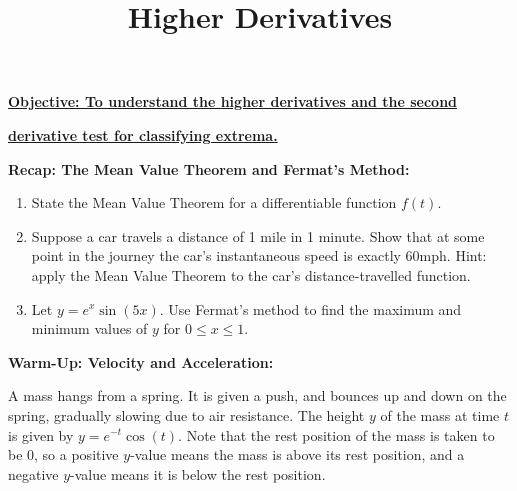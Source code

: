 \documentclass{article}
\begin{document}
\title{Higher Derivatives}
\date{}

\maketitle
\thispagestyle{empty}

\Large

\textbf{\underline{Objective: To understand the higher derivatives and the second}}

\textbf{\underline{derivative test for classifying extrema.}}




\vspace{5mm}


\textbf{Recap: The Mean Value Theorem and Fermat's Method:}

\vspace{5mm}


\begin{enumerate}
	\item State the Mean Value Theorem for a differentiable function $f(t)$.
	\item Suppose a car travels a distance of 1 mile in 1 minute. Show that at some point in the journey the car's instantaneous speed is exactly 60mph. Hint: apply the Mean Value Theorem to the car's distance-travelled function.
	\item Let $y=e^x\sin(5x)$. Use Fermat's method to find the maximum and minimum values of $y$ for $0\leq x\leq 1$.
\end{enumerate}

\bigskip




\clearpage


{\bf Warm-Up: Velocity and Acceleration:}

\vspace{5mm}


A mass hangs from a spring. It is given a push, and bounces up and down on the spring, gradually slowing due to air resistance. The height $y$ of the mass at time $t$ is given by $y=e^{- t}\cos(t)$. Note that the rest position of the mass is taken to be 0, so a positive $y$-value means the mass is above its rest position, and a negative $y$-value means it is below the rest position.\medskip
\end{document}
